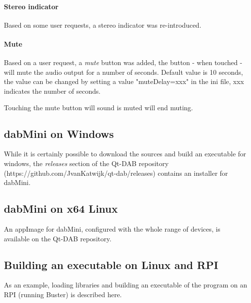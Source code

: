 \documentclass[12pt]{article}
\begin{document}
\paragraph{Stereo indicator}
Based on some user requests, a stereo indicator was re-introduced.
\paragraph{Mute}
Based on a user request, a {\em mute} button was added, the button - when touched - will mute the audio output for a number of seconds. Default value
is 10 seconds, the value can be changed by setting a value "muteDelay=xxx"
in the ini file, xxx indicates the number of seconds.
\par
Touching the mute button will sound is muted will end muting.
\subsection{dabMini on Windows}
While it is certainly possible to download the sources and build an
executable for windows, the {\em releases} section of the Qt-DAB
repository (https://github.com/JvanKatwijk/qt-dab/releases) contains
an installer for dabMini.
\subsection{dabMini on x64 Linux}
An appImage for dabMini, configured with the whole range of devices,
is available on the Qt-DAB repository.
\subsection{Building an executable on Linux and RPI}
As an example, loading libraries and building an executable of
the program on an RPI (running Buster) is described here.
\end{document}
